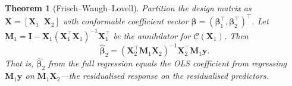 \documentclass[11pt,a4paper]{article}
\theoremstyle{plain}
\newtheorem{theorem}{Theorem}[section]
\theoremstyle{definition}
\newcommand{\bhat}{\hat{\bm{\beta}}}
\newcommand{\bX}{\bm{X}}
\newcommand{\by}{\bm{y}}
\newcommand{\bM}{\bm{M}}
\newcommand{\bI}{\bm{I}}
\newcommand{\Col}{\mathcal{C}}
\begin{document}
\begin{theorem}[Frisch--Waugh--Lovell]\label{thm:fwl}
Partition the design matrix as $\bX = [\bX_1\;\;\bX_2]$
with conformable coefficient vector $\bm{\beta}=(\bm{\beta}_1^\top,\bm{\beta}_2^\top)^\top$.
Let $\bM_1 = \bI - \bX_1(\bX_1^\top\bX_1)^{-1}\bX_1^\top$ be the
annihilator for $\Col(\bX_1)$.
Then
\begin{equation}\label{eq:fwl}
  \bhat_2 = (\bX_2^\top\bM_1\bX_2)^{-1}\bX_2^\top\bM_1\by.
\end{equation}
That is, $\bhat_2$ from the full regression equals the OLS coefficient
from regressing $\bM_1\by$ on $\bM_1\bX_2$---the
\emph{residualised} response on the \emph{residualised} predictors.
\end{theorem}

\end{document}
